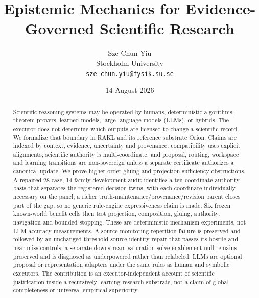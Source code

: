 \documentclass[11pt]{article}
\title{Epistemic Mechanics for Evidence-Governed Scientific Research}
\author{Sze Chun Yiu\\Stockholm University\\\texttt{sze-chun.yiu@fysik.su.se}}
\date{14 August 2026}
\begin{document}
\setlength{\emergencystretch}{3em}
\allowdisplaybreaks
\maketitle

\begin{abstract}
Scientific reasoning systems may be operated by humans, deterministic algorithms, theorem provers, learned models, large language models (LLMs), or hybrids. The executor does not determine which outputs are licensed to change a scientific record. We formalize that boundary in RAKL and its reference substrate Orion. Claims are indexed by context, evidence, uncertainty and provenance; compatibility uses explicit alignments; scientific authority is multi-coordinate; and proposal, routing, workspace and learning transitions are non-sovereign unless a separate certificate authorizes a canonical update. We prove higher-order gluing and projection-sufficiency obstructions. A repaired 28-case, 14-family development audit identifies a ten-coordinate authority basis that separates the registered decision twins, with each coordinate individually necessary on the panel; a richer truth-maintenance/provenance/revision parent closes part of the gap, so no generic rule-engine expressiveness claim is made. Six frozen known-world benefit cells then test projection, composition, gluing, authority, navigation and bounded stopping. These are deterministic mechanism experiments, not LLM-accuracy measurements. A source-monitoring repetition failure is preserved and followed by an unchanged-threshold source-identity repair that passes its hostile and near-miss controls; a separate downstream saturation solve-enablement null remains preserved and is diagnosed as underpowered rather than relabeled. LLMs are optional proposal or representation adapters under the same rules as human and symbolic executors. The contribution is an executor-independent account of scientific justification inside a recursively learning research substrate, not a claim of global completeness or universal empirical superiority.
\end{abstract}

























\end{document}
